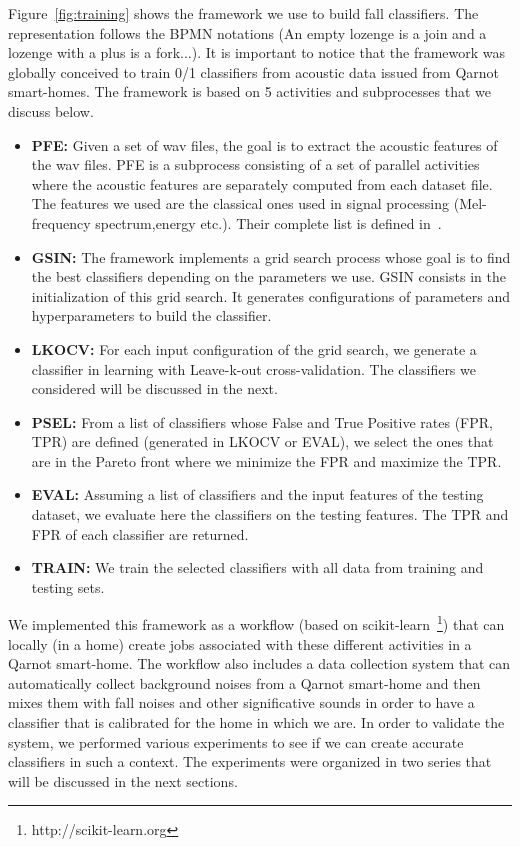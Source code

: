 \documentclass[10pt, conference, compsocconf]{IEEEtran}
\begin{document}
Figure~\ref{fig:training} shows the framework we use to build fall classifiers. The representation follows the 
BPMN notations (An empty lozenge is a join and a lozenge with a plus is a fork...). It is important to notice that 
the framework was globally conceived to train 0/1 classifiers from acoustic data issued from Qarnot smart-homes. 
The framework is based on 5 activities and subprocesses that we discuss below.

\begin{itemize}

\item {\bf PFE:} Given a set of wav files, the goal is to extract the acoustic features of the wav files. PFE is a subprocess 
consisting of a set of parallel activities where the acoustic features are separately computed from each dataset file. 
The features we used are the classical ones used in signal processing (Mel-frequency spectrum,energy etc.). Their complete list 
is defined in~\cite{pyAudioAnalysis}.

\item {\bf GSIN:} The framework implements a grid search process whose goal is to find the best classifiers depending on the 
parameters we use. GSIN consists in the initialization of this grid search. It generates configurations of parameters and hyperparameters 
to build the classifier.

\item {\bf LKOCV:} For each input configuration of the grid search, we generate a classifier in learning with 
Leave-k-out cross-validation. The classifiers we considered will be discussed in the next.

\item {\bf PSEL:} From a list of classifiers whose False and True Positive rates (FPR, TPR) are defined (generated in LKOCV or EVAL), we select the ones that are in the Pareto front where we minimize the FPR and maximize the TPR.

\item {\bf EVAL:}  Assuming a list of classifiers and the input features of the testing dataset, we evaluate here the classifiers on the testing features. The TPR and FPR of each classifier are returned.

\item {\bf TRAIN:} We train the selected classifiers with all data from training and testing sets.
\end{itemize}

We implemented this framework as a workflow (based on scikit-learn~\footnote{http://scikit-learn.org}) that can locally (in a home) create jobs associated with these different activities in 
a Qarnot smart-home. The workflow also includes a data collection system that can automatically collect background noises 
from a Qarnot smart-home and then mixes them with fall noises and other significative sounds in order to have a classifier 
that is calibrated for the home in which we are. 
In order to validate the system, we performed various experiments to see if we can create accurate classifiers in 
such a context. The experiments were organized in two series that will be discussed in the next sections.
\end{document}

